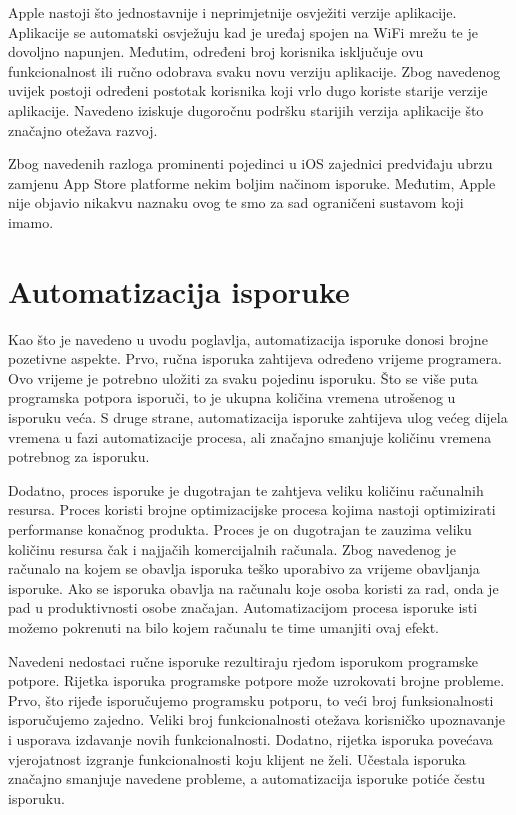 \documentclass[times, utf8, diplomski, numeric]{fer}
\begin{document}
Apple nastoji što jednostavnije i neprimjetnije osvježiti verzije aplikacije. Aplikacije se automatski osvježuju kad je uređaj spojen na WiFi mrežu te je dovoljno napunjen. Međutim, određeni broj korisnika isključuje ovu funkcionalnost ili ručno odobrava svaku novu verziju aplikacije. Zbog navedenog uvijek postoji određeni postotak korisnika koji vrlo dugo koriste starije verzije aplikacije. Navedeno iziskuje dugoročnu podršku starijih verzija aplikacije što značajno otežava razvoj.

Zbog navedenih razloga prominenti pojedinci u iOS zajednici predviđaju ubrzu zamjenu App Store platforme nekim boljim načinom isporuke. Međutim, Apple nije objavio nikakvu naznaku ovog te smo za sad ograničeni sustavom koji imamo.


\section{Automatizacija isporuke} \label{header:Automatizacija_isporuke}

Kao što je navedeno u uvodu poglavlja, automatizacija isporuke donosi brojne pozetivne aspekte. Prvo, ručna isporuka zahtijeva određeno vrijeme programera. Ovo vrijeme je potrebno uložiti za svaku pojedinu isporuku. Što se više puta programska potpora isporuči, to je ukupna količina vremena utrošenog u isporuku veća. S druge strane, automatizacija isporuke zahtijeva ulog većeg dijela vremena u fazi automatizacije procesa, ali značajno smanjuje količinu vremena potrebnog za isporuku.

Dodatno, proces isporuke je dugotrajan te zahtjeva veliku količinu računalnih resursa. Proces koristi brojne optimizacijske procesa kojima nastoji optimizirati performanse konačnog produkta. Proces je on dugotrajan te zauzima veliku količinu resursa čak i najjačih komercijalnih računala. Zbog navedenog je računalo na kojem se obavlja isporuka teško uporabivo za vrijeme obavljanja isporuke. Ako se isporuka obavlja na računalu koje osoba koristi za rad, onda je pad u produktivnosti osobe značajan. Automatizacijom procesa isporuke isti možemo pokrenuti na bilo kojem računalu te time umanjiti ovaj efekt.

Navedeni nedostaci ručne isporuke rezultiraju rjeđom isporukom programske potpore. Rijetka isporuka programske potpore može uzrokovati brojne probleme. Prvo, što rijeđe isporučujemo programsku potporu, to veći broj funksionalnosti isporučujemo zajedno. Veliki broj funkcionalnosti otežava korisničko upoznavanje i usporava izdavanje novih funkcionalnosti. Dodatno, rijetka isporuka povećava vjerojatnost izgranje funkcionalnosti koju klijent ne želi. Učestala isporuka značajno smanjuje navedene probleme, a automatizacija isporuke potiće čestu isporuku.
\end{document}
